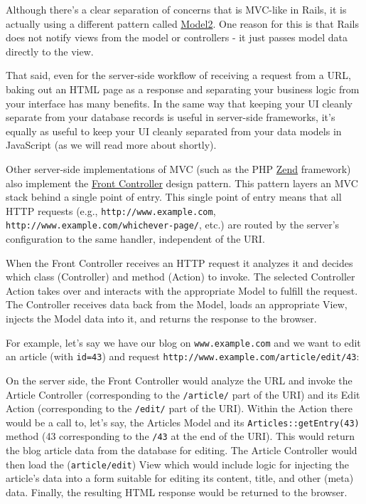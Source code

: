 \documentclass[9pt]{book}
\begin{document}
Although there's a clear separation of concerns that is MVC-like in
Rails, it is actually using a different pattern called
\href{http://en.wikipedia.org/wiki/Model2}{Model2}. One reason for this
is that Rails does not notify views from the model or controllers - it
just passes model data directly to the view.

That said, even for the server-side workflow of receiving a request from
a URL, baking out an HTML page as a response and separating your
business logic from your interface has many benefits. In the same way
that keeping your UI cleanly separate from your database records is
useful in server-side frameworks, it's equally as useful to keep your UI
cleanly separated from your data models in JavaScript (as we will read
more about shortly).

Other server-side implementations of MVC (such as the PHP
\href{http://zend.com}{Zend} framework) also implement the
\href{http://en.wikipedia.org/wiki/Front_Controller_pattern}{Front
Controller} design pattern. This pattern layers an MVC stack behind a
single point of entry. This single point of entry means that all HTTP
requests (e.g., \texttt{http://www.example.com},
\texttt{http://www.example.com/whichever-page/}, etc.) are routed by the
server's configuration to the same handler, independent of the URI.

When the Front Controller receives an HTTP request it analyzes it and
decides which class (Controller) and method (Action) to invoke. The
selected Controller Action takes over and interacts with the appropriate
Model to fulfill the request. The Controller receives data back from the
Model, loads an appropriate View, injects the Model data into it, and
returns the response to the browser.

For example, let's say we have our blog on \texttt{www.example.com} and
we want to edit an article (with \texttt{id=43}) and request
\texttt{http://www.example.com/article/edit/43}:

On the server side, the Front Controller would analyze the URL and
invoke the Article Controller (corresponding to the \texttt{/article/}
part of the URI) and its Edit Action (corresponding to the
\texttt{/edit/} part of the URI). Within the Action there would be a
call to, let's say, the Articles Model and its
\texttt{Articles::getEntry(43)} method (43 corresponding to the
\texttt{/43} at the end of the URI). This would return the blog article
data from the database for editing. The Article Controller would then
load the (\texttt{article/edit}) View which would include logic for
injecting the article's data into a form suitable for editing its
content, title, and other (meta) data. Finally, the resulting HTML
response would be returned to the browser.
\end{document}
